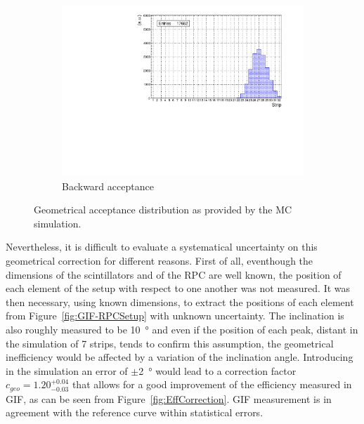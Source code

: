 \begin{figure}[H]
\begin{subfigure}{0.5\linewidth}
			\includegraphics[width = 0.6\plotwidth]{fig/chapt5/Geometrical-acceptance-backward.pdf}
			\caption{\label{fig:SimResult:C} Backward acceptance}
		\end{subfigure}
		\caption{\label{fig:SimResult} Geometrical acceptance distribution as provided by the \acl{MC} simulation.}
	\end{figure}
	
	Nevertheless, it is difficult to evaluate a systematical uncertainty on this geometrical correction for different reasons. First of all, eventhough the dimensions of the scintillators and of the RPC are well known, the position of each element of the setup with respect to one another was not measured. It was then necessary, using known dimensions, to extract the positions of each element from Figure~\ref{fig:GIF-RPCSetup} with unknown uncertainty. The inclination is also roughly measured to be \SI{10}{\degree} and even if the position of each peak, distant in the simulation of 7 strips, tends to confirm this assumption, the geometrical inefficiency would be affected by a variation of the inclination angle. Introducing in the simulation an error of $\pm$\SI{2}{\degree} would lead to a correction factor $c_{geo} = 1.20^{+0.04}_{-0.03}$ that allows for a good improvement of the efficiency measured in GIF, as can be seen from Figure~\ref{fig:EffCorrection}. GIF measurement is in agreement with the reference curve within statistical errors.

